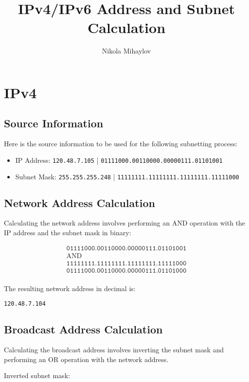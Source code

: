 \documentclass{article}
\title{IPv4/IPv6 Address and Subnet Calculation}
\author{Nikola Mihaylov}
\date{}
\begin{document}
\maketitle

\section*{IPv4}

\subsection*{Source Information}

Here is the source information to be used for the following subnetting process:

\begin{itemize}
    \item IP Address: \texttt{120.48.7.105} | \texttt{01111000.00110000.00000111.01101001}
    \item Subnet Mask: \texttt{255.255.255.248} | \texttt{11111111.11111111.11111111.11111000}
\end{itemize}

\subsection*{Network Address Calculation}
Calculating the network address involves performing an AND operation with the IP address and the subnet mask in binary:

\[
\begin{array}{c}
\texttt{01111000.00110000.00000111.01101001} \\
\text{AND} \\
\texttt{11111111.11111111.11111111.11111000} \\
\hline
\texttt{01111000.00110000.00000111.01101000} \\
\end{array}
\]

The resulting network address in decimal is:

\texttt{120.48.7.104}

\subsection*{Broadcast Address Calculation}
Calculating the broadcast address involves inverting the subnet mask and performing an OR operation with the network address.

Inverted subnet mask:
\end{document}
